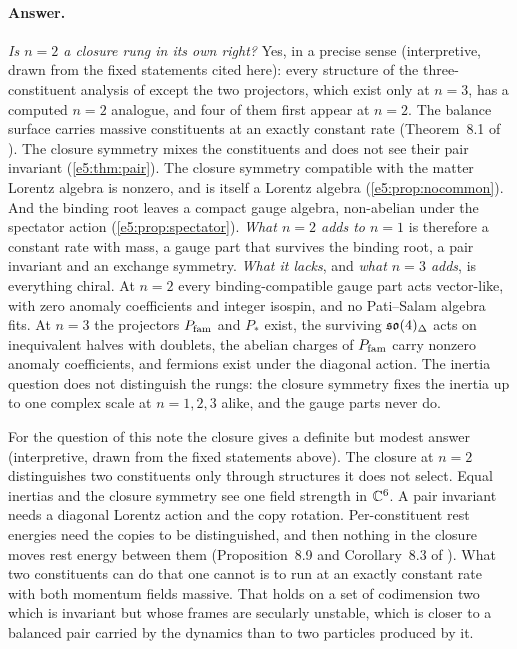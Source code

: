 \paragraph{Answer.} \emph{Is $n=2$ a closure rung in its own right?} Yes, in a precise sense (interpretive, drawn from the fixed statements cited here):
every structure of the three-constituent analysis of \cite{ES17} except the two projectors, which exist only at $n=3$, has a computed $n=2$
analogue, and four of them first appear at $n=2$. The balance surface carries massive constituents at
an exactly constant rate (Theorem~8.1 of \cite{RE}). The closure symmetry mixes the constituents and does not see their pair invariant
(\cref{e5:thm:pair}). The closure symmetry compatible with the matter Lorentz algebra is nonzero, and is itself a Lorentz algebra (\cref{e5:prop:nocommon}).
And the binding root leaves a compact gauge algebra, non-abelian under the spectator action (\cref{e5:prop:spectator}). \emph{What $n=2$ adds to $n=1$} is
therefore a constant rate with mass, a gauge part that survives the binding root, a pair invariant and an exchange symmetry. \emph{What it lacks}, and
\emph{what $n=3$ adds}, is everything chiral. At $n=2$ every binding-compatible gauge part acts vector-like, with zero anomaly coefficients and integer
isospin, and no Pati--Salam algebra fits. At $n=3$ the projectors $P_{\rm fam}$ and $P_*$ exist, the surviving $\mathfrak{so}(4)_\Delta$ acts on inequivalent halves
with doublets, the abelian charges of $P_{\rm fam}$ carry nonzero anomaly coefficients, and fermions exist under the diagonal action. The inertia question does
not distinguish the rungs: the closure symmetry fixes the inertia up to one complex scale at $n=1,2,3$ alike, and the gauge parts never do.

For the question of this note the closure gives a definite but modest answer (interpretive, drawn from the fixed statements above). The closure at $n=2$
distinguishes two constituents only through structures it does not select. Equal inertias and the closure symmetry see one field strength in $\mathbb{C}^6$. A
pair invariant needs a diagonal Lorentz action and the copy rotation. Per-constituent rest energies need the copies to be distinguished, and then nothing in
the closure moves rest energy between them (Proposition~8.9 and Corollary~8.3 of \cite{RE}). What two constituents can do that one cannot is to run at
an exactly constant rate with both momentum fields massive. That holds on a set of codimension two which is invariant but whose frames are secularly
unstable, which is closer to a balanced pair carried by the dynamics than to two particles produced by it.
